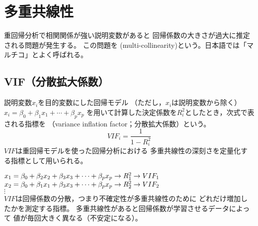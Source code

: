 \newcommand{\Draft}{}
\newcommand{\Slide}{}
\newcommand{\PrintLecture}{1}
\newcommand{\PrintSolution}{1}








\maketitle

\MyFrame{}{\tableofcontents}

\section{多重共線性}

\MyFrame{\insertsection}
{
  重回帰分析で相関関係が強い説明変数があると
  回帰係数の大きさが過大に推定される問題が発生する。
  この問題を
  (multi-collinearity)という。日本語では「マルチコ」とよく呼ばれる。
}

\subsection{VIF（分散拡大係数）}

\MyFrame{\insertsubsection}
{
  {
    説明変数$x_i$を目的変数にした回帰モデル
    （ただし，$x_i$は説明変数から除く）
    $x_i = \beta_0 + \beta_1 x_1 + \cdots + \beta_p x_p$
    を用いて計算した決定係数を$R_i^2$としたとき，次式で表される指標を
    （variance inflation factor；分散拡大係数）という。
    \[VIF_i = \frac{1}{1-R_i^2}\]
    $VIF$は重回帰モデルを使った回帰分析における
    多重共線性の深刻さを定量化する指標として用いられる。
  }
}

{
  $x_1=\beta_0+\beta_2 x_2+\beta_3 x_3+\cdots+\beta_p x_p
  \rightarrow R_1^2 \rightarrow VIF_1$\\
  $x_2=\beta_0+\beta_1 x_1+\beta_3 x_3+\cdots+\beta_p x_p
  \rightarrow R_2^2 \rightarrow VIF_2$\\
  $\vdots$\\
  $VIF$は回帰係数の分散，つまり不確定性が多重共線性のために
  どれだけ増加したかを測定する指標。
  多重共線性があると回帰係数が学習させるデータによって
  値が毎回大きく異なる（不安定になる）。
}

